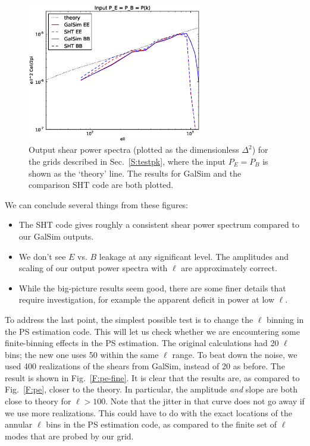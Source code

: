\documentclass[preprint]{aastex}
\begin{document}
\begin{figure}
\begin{center}
\includegraphics[width=3in]{../external/test_gridshear/output/compare_input_peb.eps}
\caption{Output shear power spectra (plotted as the dimensionless
  $\Delta^2$) for the grids described in Sec.~\ref{S:testpk}, where
  the input $P_E=P_B$ is shown as the `theory' line. The results for GalSim and the
  comparison SHT code are both plotted.\label{F:peb}}
\end{center}
\end{figure}

We can conclude several things from these figures:
\begin{itemize}
\item The SHT code gives roughly a consistent shear power spectrum compared
  to our GalSim outputs.
\item We don't see $E$ vs\@. $B$ leakage at any significant
  level.  The amplitudes and scaling of our output power spectra with
  $\ell$ are approximately correct.
\item While the big-picture results seem good, there are some finer
  details that require investigation, for example the apparent deficit
  in power at low $\ell$.
\end{itemize}

To address the last point, the simplest possible test is to
change the $\ell$ binning in the PS estimation code.  This will let us
check whether we are encountering some finite-binning effects in the
PS estimation.  The original calculations had 20 $\ell$ bins; the new
one uses 50 within the same $\ell$ range.  To beat down the noise, we
used 400 realizations of the shears from GalSim, instead of 20 as
before.  The result is shown in Fig.~\ref{F:pe-fine}.  It is clear
that the results are, as compared to Fig.~\ref{F:pe}, closer to the
theory.  In particular, the amplitude {\em and} slope are both close
to theory for $\ell>100$.  Note that the jitter in that curve does not
go away if we use more realizations.  This could have to do with the
exact locations of the annular $\ell$ bins in the PS estimation code,
as compared to the finite set of $\ell$ modes that are probed by our
grid.
\end{document}
